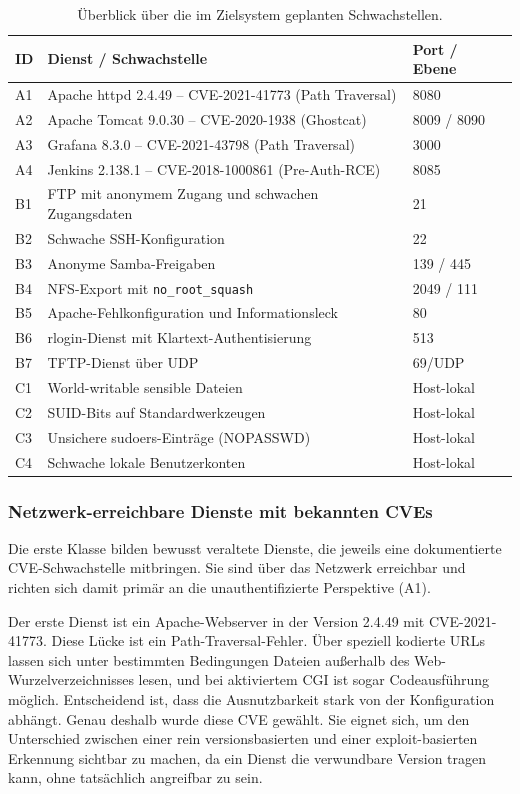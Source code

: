 \begin{table}[H]
\centering
\renewcommand{\arraystretch}{1.25}
\begin{tabular}{p{1.0cm}p{7.5cm}p{3.4cm}}
\hline
\textbf{ID} & \textbf{Dienst / Schwachstelle} & \textbf{Port / Ebene} \\
\hline
A1 & Apache httpd 2.4.49 -- CVE-2021-41773 (Path Traversal) & 8080 \\
A2 & Apache Tomcat 9.0.30 -- CVE-2020-1938 (Ghostcat) & 8009 / 8090 \\
A3 & Grafana 8.3.0 -- CVE-2021-43798 (Path Traversal) & 3000 \\
A4 & Jenkins 2.138.1 -- CVE-2018-1000861 (Pre-Auth-RCE) & 8085 \\
\hline
B1 & FTP mit anonymem Zugang und schwachen Zugangsdaten & 21 \\
B2 & Schwache SSH-Konfiguration & 22 \\
B3 & Anonyme Samba-Freigaben & 139 / 445 \\
B4 & NFS-Export mit \texttt{no\_root\_squash} & 2049 / 111 \\
B5 & Apache-Fehlkonfiguration und Informationsleck & 80 \\
B6 & rlogin-Dienst mit Klartext-Authentisierung & 513 \\
B7 & TFTP-Dienst über UDP & 69/UDP \\
\hline
C1 & World-writable sensible Dateien & Host-lokal \\
C2 & SUID-Bits auf Standardwerkzeugen & Host-lokal \\
C3 & Unsichere sudoers-Einträge (NOPASSWD) & Host-lokal \\
C4 & Schwache lokale Benutzerkonten & Host-lokal \\
\hline
\end{tabular}
\caption{Überblick über die im Zielsystem geplanten Schwachstellen.}
\label{tab:uc1-zielsystem}
\end{table}

\subsubsection{Netzwerk-erreichbare Dienste mit bekannten CVEs}

Die erste Klasse bilden bewusst veraltete Dienste, die jeweils eine dokumentierte CVE-Schwachstelle
mitbringen. Sie sind über das Netzwerk erreichbar und richten sich damit primär an die
unauthentifizierte Perspektive (A1).

Der erste Dienst ist ein Apache-Webserver in der Version 2.4.49 mit CVE-2021-41773. Diese Lücke ist
ein Path-Traversal-Fehler. Über speziell kodierte URLs lassen sich unter bestimmten Bedingungen
Dateien außerhalb des Web-Wurzelverzeichnisses lesen, und bei aktiviertem CGI ist sogar
Codeausführung möglich. Entscheidend ist, dass die Ausnutzbarkeit stark von der Konfiguration
abhängt. Genau deshalb wurde diese CVE gewählt. Sie eignet sich, um den Unterschied zwischen einer
rein versionsbasierten und einer exploit-basierten Erkennung sichtbar zu machen, da ein Dienst die
verwundbare Version tragen kann, ohne tatsächlich angreifbar zu sein.

